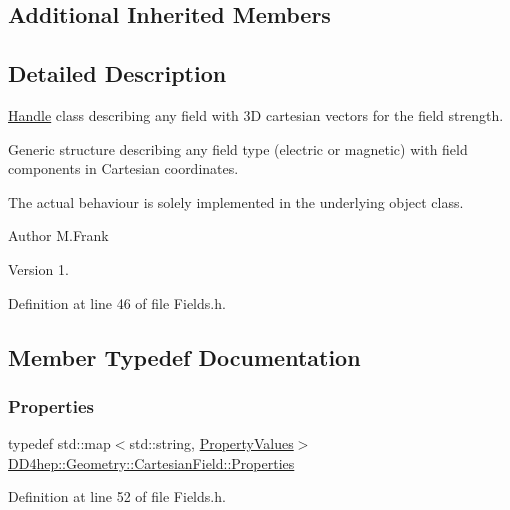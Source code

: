 \subsection*{Additional Inherited Members}


\subsection{Detailed Description}
\hyperlink{class_d_d4hep_1_1_handle}{Handle} class describing any field with 3D cartesian vectors for the field strength. 

Generic structure describing any field type (electric or magnetic) with field components in Cartesian coordinates.

The actual behaviour is solely implemented in the underlying object class.

\begin{DoxyAuthor}{Author}
M.\+Frank 
\end{DoxyAuthor}
\begin{DoxyVersion}{Version}
1. 
\end{DoxyVersion}


Definition at line 46 of file Fields.\+h.



\subsection{Member Typedef Documentation}
\hypertarget{class_d_d4hep_1_1_geometry_1_1_cartesian_field_a37a636b9f5ee9ead172cca958dacb920}{}\label{class_d_d4hep_1_1_geometry_1_1_cartesian_field_a37a636b9f5ee9ead172cca958dacb920} 
\subsubsection{\texorpdfstring{Properties}{Properties}}
{\footnotesize\ttfamily typedef std\+::map$<$std\+::string, \hyperlink{class_d_d4hep_1_1_geometry_1_1_cartesian_field_a05dc63b1528e795f7d877d3fb236c394}{Property\+Values}$>$ \hyperlink{class_d_d4hep_1_1_geometry_1_1_cartesian_field_a37a636b9f5ee9ead172cca958dacb920}{D\+D4hep\+::\+Geometry\+::\+Cartesian\+Field\+::\+Properties}}



Definition at line 52 of file Fields.\+h.

